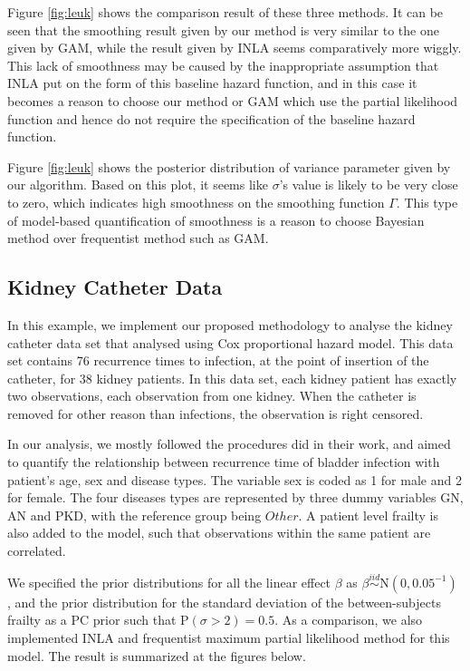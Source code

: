\documentclass[]{article}
\begin{document}
Figure \ref{fig:leuk} shows the comparison result of these three methods. It can be seen that the smoothing result given by our method is very similar to the one given by GAM, while the result given by INLA seems comparatively more wiggly. This lack of smoothness may be caused by the inappropriate assumption that INLA put on the form of this baseline hazard function, and in this case it becomes a reason to choose our method or GAM which use the partial likelihood function and hence do not require the specification of the baseline hazard function.

Figure \ref{fig:leuk} shows the posterior distribution of variance parameter given by our algorithm. Based on this plot, it seems like $\sigma$'s value is likely to be very close to zero, which indicates high smoothness on the smoothing function $\Gamma$. This type of model-based quantification of smoothness is a reason to choose Bayesian method over frequentist method such as GAM.


\subsection{Kidney Catheter Data}

In this example, we implement our proposed methodology to analyse the kidney catheter data set that \citet{kidney} analysed using Cox proportional hazard model. This data set contains 76 recurrence times to infection, at the point of insertion of the catheter, for 38 kidney patients. In this data set, each kidney patient has exactly two observations, each observation from one kidney. When the catheter is removed for other reason than infections, the observation is right censored.

In our analysis, we mostly followed the procedures \citet{kidney} did in their work, and aimed to quantify the relationship between recurrence time of bladder infection with patient's age, sex and  disease types. The variable sex is coded as 1 for male and 2 for female. The four diseases types are represented by three dummy variables $\text{GN}$, $\text{AN}$ and $\text{PKD}$, with the reference group being $Other$. A patient level frailty is also added to the model, such that observations within the same patient are correlated. 

We specified the prior distributions for all the linear effect $\beta$ as $\beta \stackrel{iid}{\sim} \text{N}(0, 0.05^{-1})$ , and the prior distribution for the standard deviation of the between-subjects frailty as a PC prior such that $\text{P}(\sigma > 2) = 0.5$. As a comparison, we also implemented INLA and frequentist maximum partial likelihood method for this model. The result is summarized at the figures below.
\end{document}

